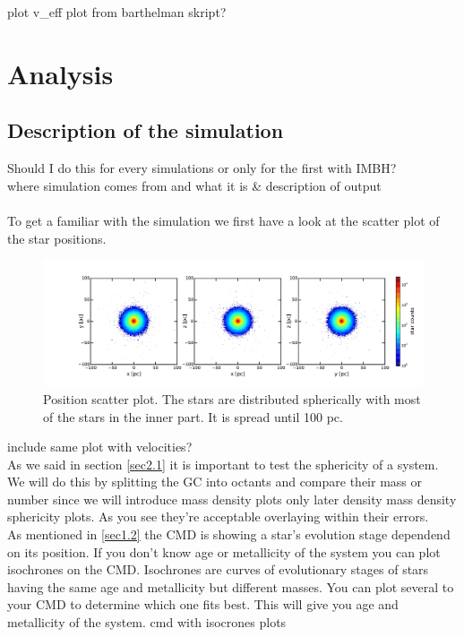 \documentclass[a4paper,12pt,abstracton]{scrartcl}
\begin{document}
\color{red} plot v\_eff plot from barthelman skript? \color{black}

\newpage
\section{Analysis}

\subsection{Description of the simulation}
\color{red} Should I do this for every simulations or only for the first with IMBH? \color{black}\\
where simulation comes from and what it is \& description of output\\
\\
To get a familiar with the simulation we first have a look at the scatter plot of the star positions.
\begin{figure}[htbp] 
  \includegraphics[width=\textwidth,left]{Plots/position_scatter_plot_IMBH1.pdf}
  \caption{Position scatter plot. The stars are distributed spherically with most of the stars in the inner part. It is spread until 100 pc.}
  
  \label{fig:Bild1}
\end{figure}

\color{red} include same plot with velocities?\color{black}\\
As we said in section \ref{sec2.1} it is important to test the sphericity of a system. We will do this by splitting the \ac{GC} into octants and compare their mass \color{red} or number since we will introduce mass density plots only later \color{black} density \color{red} mass density sphericity plots\color{black}. As you see they're acceptable overlaying \color{red} within their errors. \color{black}
\\
As mentioned in \ref{sec1.2} the \ac{CMD} is showing a star's evolution stage dependend on its position. If you don't know age or metallicity of the system you can plot isochrones on the \ac{CMD}. Isochrones are curves of evolutionary stages of stars having the same age and metallicity but different masses. You can plot several to your \ac{CMD} to determine which one fits best. This will give you age and metallicity of the system. \color{red} cmd with isocrones plots \color{black}
\end{document}

